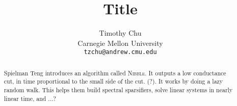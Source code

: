 


\title{Title}
\author{
  Timothy Chu \\
  Carnegie Mellon University\\
  \texttt{tzchu@andrew.cmu.edu}
}

\setcounter{page}{0}
\maketitle
\thispagestyle{empty}
\begin{abstract}
  Spielman Teng introduces an algorithm called \textsc{Nibble}.
  It outputs a low conductance cut, in time proportional to the
  small side of the cut. (?). It works by doing a lazy random
  walk. This helps them build spectral sparsifiers, solve linear
  systems in nearly linear time, and ...?
\end{abstract}

\clearpage


\begin{appendix}
\end{appendix}

